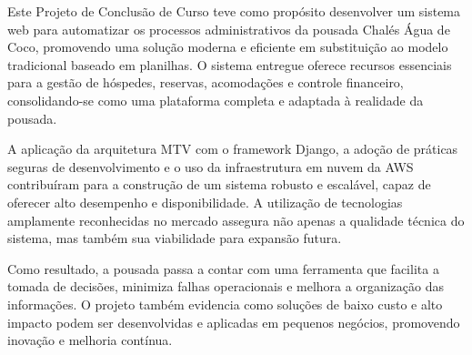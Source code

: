 \documentclass[
	12pt,				%
	openany,			%
	oneside,			%
	a4paper,			%
	english,			%
	french,				%
	spanish,			%
	brazil				%
	]{abntex2}
\begin{document}
Este Projeto de Conclusão de Curso teve como propósito desenvolver um sistema web para automatizar os processos administrativos da pousada Chalés Água de Coco, promovendo uma solução moderna e eficiente em substituição ao modelo tradicional baseado em planilhas. O sistema entregue oferece recursos essenciais para a gestão de hóspedes, reservas, acomodações e controle financeiro, consolidando-se como uma plataforma completa e adaptada à realidade da pousada.

A aplicação da arquitetura MTV com o framework Django, a adoção de práticas seguras de desenvolvimento e o uso da infraestrutura em nuvem da AWS contribuíram para a construção de um sistema robusto e escalável, capaz de oferecer alto desempenho e disponibilidade. A utilização de tecnologias amplamente reconhecidas no mercado assegura não apenas a qualidade técnica do sistema, mas também sua viabilidade para expansão futura.

Como resultado, a pousada passa a contar com uma ferramenta que facilita a tomada de decisões, minimiza falhas operacionais e melhora a organização das informações. O projeto também evidencia como soluções de baixo custo e alto impacto podem ser desenvolvidas e aplicadas em pequenos negócios, promovendo inovação e melhoria contínua.


\postextual




%
%

\end{document}

